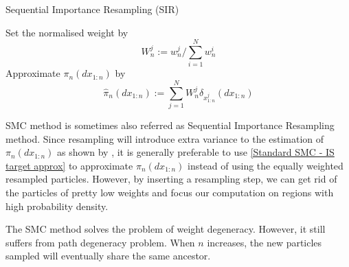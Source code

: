 \documentclass[12pt,a4paper]{article}
\begin{document}
\begin{algorithm}[htb!]
    \caption{Sequential Importance Resampling (SIR)}
    Set the normalised weight by 
    $$W_n^j := w_n^j / \sum_{i=1}^N w_{n}^i$$
    Approximate $\pi_n\left(dx_{1:n}\right)$ by 
    $$\hat{\pi}_n(dx_{1:n}) := \sum_{j=1}^{N} W_n^j \delta_{x_{1:n}^j}(dx_{1:n})$$
    \label{Alg:SIR}
\end{algorithm}

SMC method is sometimes also referred as Sequential Importance Resampling method. Since resampling will introduce extra variance to the estimation of $\pi_{n}(dx_{1:n})$ as shown by \cite{chopin2004central}, it is generally preferable to use \eqref{Standard SMC - IS target approx} to approximate $\pi_n(dx_{1:n})$ instead of using the equally weighted resampled particles. However, by inserting a resampling step, we can get rid of the particles of pretty low weights and focus our computation on regions with high probability density. 

The SMC method solves the problem of weight degeneracy. However, it still suffers from path degeneracy problem. When $n$ increases, the new particles sampled will eventually share the same ancestor.
\end{document}
